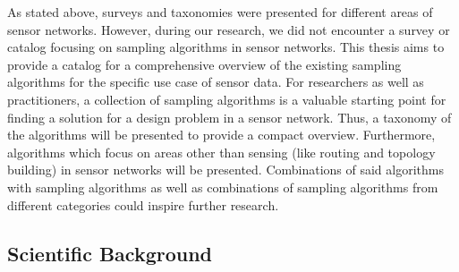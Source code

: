 As stated above, surveys and taxonomies were presented for different areas of sensor networks. However, during our research, we did not encounter a survey or catalog focusing on sampling algorithms in sensor networks. This thesis aims to provide a catalog for a comprehensive overview of the existing sampling algorithms for the specific use case of sensor data. For researchers as well as practitioners, a collection of sampling algorithms is a valuable starting point for finding a solution for a design problem in a sensor network. Thus, a taxonomy of the algorithms will be presented to provide a compact overview. Furthermore, algorithms which focus on areas other than sensing (like routing and topology building) in sensor networks will be presented. Combinations of said algorithms with sampling algorithms as well as combinations of sampling algorithms from different categories could inspire further research.


\subsection{Scientific Background}
\label{sec:Scientific Background}

